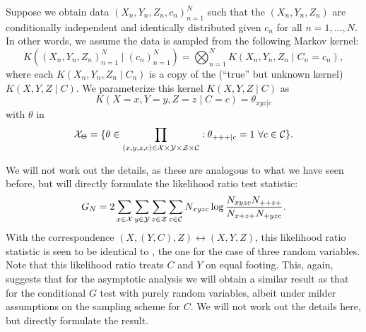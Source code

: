 Suppose we obtain data $(X_n,Y_n,Z_n,c_n)_{n=1}^N$ such that the
$(X_n,Y_n,Z_n)$ are conditionally independent and identically distributed given $c_n$ for all $n=1,\dots,N$.
In other words, we assume the data is sampled from the following Markov kernel:
$$K((X_n,Y_n,Z_n)_{n=1}^N \mid (c_n)_{n=1}^N) = \bigotimes_{n=1}^N K(X_n,Y_n,Z_n \mid C_n=c_n),$$
where each $K(X_n,Y_n,Z_n \mid C_n)$ is a copy of the (``true'' but unknown kernel) $K(X,Y,Z \mid C)$.
We parameterize this kernel $K(X,Y,Z \mid C)$ as
$$K(X=x,Y=y,Z=z \mid C=c) = \theta_{xyz|c}$$
with $\theta$ in 
$$\mathcal{X}_\Theta = \{ \theta \in \prod_{(x,y,z,c) \in \mathcal{X}\times\mathcal{Y}\times\mathcal{Z}\times\mathcal{C}} : \theta_{+++|c} = 1 \ \forall c\in\mathcal{C} \}.$$

We will not work out the details, as these are analogous to what we have seen before, but will directly formulate
the likelihood ratio test statistic:
\begin{equation}\label{eq:general_G_test_statistic}
  G_N = 2 \sum_{x\in\mathcal{X}}\sum_{y\in\mathcal{Y}}\sum_{z\in\mathcal{Z}}\sum_{c\in\mathcal{C}}
  N_{xyzc} \log \frac{N_{xyzc} N_{++z+}}{N_{x+z+} N_{+yzc}}.
\end{equation}
With the correspondence $(X,(Y,C),Z) \leftrightarrow (X,Y,Z)$, this likelihood
ratio statistic is seen to be identical to , the one for the case
of three random variables. Note that this likelihood ratio treats $C$ and $Y$ on equal footing. 
This, again, suggests that for the asymptotic analysis we will obtain
a similar result as that for the conditional $G$ test with purely random variables, albeit under milder
assumptions on the sampling scheme for $C$. We will not work out the details here, but directly
formulate the result.

